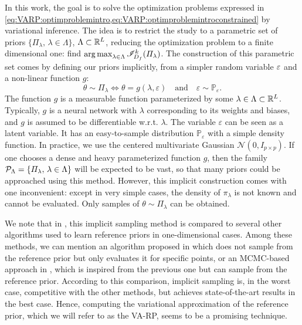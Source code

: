 In this work, the goal is to solve the optimization problems expressed in \cref{eq:VARP:optimproblemintro,eq:VARP:optimproblemintroconstrained} by variational inference.
The idea is to restrict the study to a parametric set of priors $\{\varPi_\lambda,\,\lambda\in\Lambda \}$, $\Lambda\subset\mathbb{R}^L$, reducing the optimization problem to a finite dimensional one: find $\operatorname*{arg\,max}_{\lambda\in\Lambda}\mathscr{I}_{D_f}^k(\varPi_\lambda)$. The construction of this parametric set comes by defining 
our priors implicitly, from a simpler random variable $\varepsilon$ and a non-linear function $g$:
    \begin{equation}
        \theta \sim \varPi_{\lambda} \iff \theta = g(\lambda,\varepsilon) \quad \text{and} \quad \varepsilon \sim \mathbb{P}_{\varepsilon}.
    \end{equation}
The function $g$ is a measurable function parameterized by some $\lambda\in\Lambda\subset\mathbb{R}^L$. Typically, $g$ is a neural network with $\lambda$ corresponding to its weights and biases, and $g$ is assumed to be differentiable w.r.t. $\lambda$. The variable $\varepsilon$ can be seen as a latent variable. It has an easy-to-sample distribution $\mathbb{P}_{\varepsilon}$ with a simple density function. In practice, we use the centered multivariate Gaussian $\mathcal{N}(0,I_{p\times p})$. 
If one chooses a dense and heavy parameterized function $g$, then the family $\mathcal{P}_\Lambda=\{\varPi_\lambda,\,\lambda\in\Lambda\}$ will be expected to be vast, so that many priors could be approached using this method. However, this implicit construction comes with one inconvenient: except in very simple cases, the density of $\pi_\lambda$ is not known and cannot be evaluated. Only samples of $\theta\sim\varPi_\lambda$ can be obtained.


We note that
in \cite{nalisnick_learning_2017}, this implicit sampling method is compared to several other algorithms used to learn reference priors in one-dimensional cases. %
Among these methods, we can mention an algorithm proposed in \cite{berger_formal_2009} which does not sample from the reference prior but only evaluates it for specific points, or an MCMC-based approach in \cite{lafferty_iterative_2001}, which is inspired from the previous one but can sample from the reference prior.
According to this comparison, implicit sampling is, in the worst case, competitive with the other methods, but achieves state-of-the-art results in the best case. Hence, computing the variational approximation of the reference prior, which we will refer to as the VA-RP, seems to be a promising technique. %


